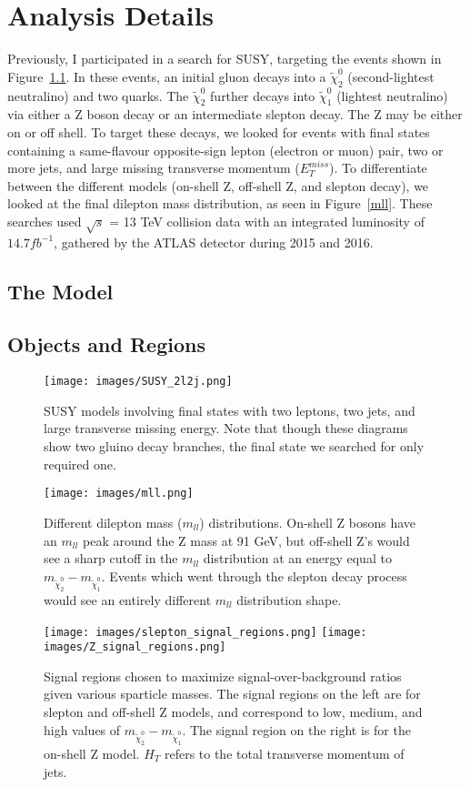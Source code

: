 \chapter{Analysis Details}

Previously, I participated in a search for SUSY, targeting the events shown in Figure~\ref{SUSY_2l2j}. In these events, an initial gluon decays into a $\tilde{\chi}^0_2$ (second-lightest neutralino) and two quarks. The $\tilde{\chi}^0_2$ further decays into $\tilde{\chi}^0_1$ (lightest neutralino) via either a Z boson decay or an intermediate slepton decay. The Z may be either on or off shell. To target these decays, we looked for events with final states containing a same-flavour opposite-sign lepton (electron or muon) pair, two or more jets, and large missing transverse momentum ($E_T^{miss}$). To differentiate between the different models (on-shell Z, off-shell Z, and slepton decay), we looked at the final dilepton mass distribution, as seen in Figure~\ref{mll}. These searches used $\sqrt{s}$ = 13 TeV collision data with an integrated luminosity of $14.7 fb^{-1}$, gathered by the ATLAS detector during 2015 and 2016.

\section{The Model}

\section{Objects and Regions}

\begin{figure}[t]
    \centering
    \texttt{[image: images/SUSY\_2l2j.png]}
    \caption{SUSY models involving final states with two leptons, two jets, and large transverse missing energy. Note that though these diagrams show two gluino decay branches, the final state we searched for only required one.}
    \label{SUSY_2l2j}
\end{figure}

\begin{figure}[t]
    \centering
    \texttt{[image: images/mll.png]}
    \caption{Different dilepton mass ($m_{ll}$) distributions. On-shell Z bosons have an $m_{ll}$ peak around the Z mass at 91 GeV, but off-shell Z's would see a sharp cutoff in the $m_{ll}$ distribution at an energy equal to $m_{\tilde{\chi}^0_2} - m_{\tilde{\chi}^0_1}$. Events which went through the slepton decay process would see an entirely different $m_{ll}$ distribution shape.}
    \label{mll}
    
	\centering
    \texttt{[image: images/slepton\_signal\_regions.png]}
    \texttt{[image: images/Z\_signal\_regions.png]}
    \caption{Signal regions chosen to maximize signal-over-background ratios given various sparticle masses. The signal regions on the left are for slepton and off-shell Z models, and correspond to low, medium, and high values of $m_{\tilde{\chi}^0_2} - m_{\tilde{\chi}^0_1}$. The signal region on the right is for the on-shell Z model. $H_T$ refers to the total transverse momentum of jets.}
    \label{signal_regions}
\end{figure}

